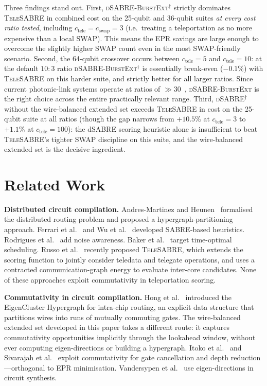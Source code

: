 \documentclass[conference]{IEEEtran}
\newcommand{\dSABRE}{\textsc{dSABRE}}
\newcommand{\BurstExt}{\textsc{dSABRE-BurstExt}}
\newcommand{\TeleSABRE}{\textsc{TeleSABRE}}
\newcommand{\SABRE}{\textsc{SABRE}}
\begin{document}
Three findings stand out.
First, \BurstExt$^{\dagger}$ strictly dominates \TeleSABRE{} in combined
cost on the 25-qubit and 36-qubit suites \emph{at every cost ratio tested},
including $c_{\mathrm{tele}}=c_{\mathrm{swap}}=3$ (i.e.\ treating a
teleportation as no more expensive than a local SWAP).
This means the EPR savings are large enough to overcome the slightly higher
SWAP count even in the most SWAP-friendly scenario.
Second, the 64-qubit crossover occurs between $c_{\mathrm{tele}}=5$ and
$c_{\mathrm{tele}}=10$: at the default $10{:}3$ ratio \BurstExt$^{\dagger}$
is essentially break-even ($-0.1\%$) with \TeleSABRE{} on this harder
suite, and strictly better for all larger ratios.
Since current photonic-link systems operate at ratios of ${\gg}30$~\cite{stephenson2020high},
\BurstExt{} is the right choice across the entire practically relevant range.
Third, \dSABRE$^{\dagger}$ without the wire-balanced extended set
exceeds \TeleSABRE{} in cost on the 25-qubit suite at all ratios
(though the gap narrows from $+10.5\%$ at $c_{\mathrm{tele}}=3$
to $+1.1\%$ at $c_{\mathrm{tele}}=100$): the dSABRE scoring heuristic
alone is insufficient to beat \TeleSABRE{}'s tighter SWAP discipline
on this suite, and the wire-balanced extended set is the decisive ingredient.

\section{Related Work}
\label{sec:related}

\textbf{Distributed circuit compilation.}
Andres-Martinez and Heunen~\cite{andres2019automated} formalised the distributed
routing problem and proposed a hypergraph-partitioning approach.
Ferrari et al.~\cite{ferrari2021compiler} and Wu et al.~\cite{wu2022collcomm}
developed \SABRE{}-based heuristics.
Rodrigues et al.~\cite{rodrigues2022noise} add noise awareness.
Baker et al.~\cite{baker2020time} target time-optimal scheduling.
Russo et al.~\cite{russo2025telesabre} recently proposed \TeleSABRE{}, which
extends the scoring function to jointly consider teledata and telegate operations,
and uses a contracted communication-graph energy to evaluate inter-core candidates.
None of these approaches exploit commutativity in teleportation scoring.

\textbf{Commutativity in circuit compilation.}
Hong et al.~\cite{hong2024commutativity} introduced the EigenCluster Hypergraph
for intra-chip routing, an explicit data structure that partitions wires into
runs of mutually commuting gates.
The wire-balanced extended set developed in this paper takes a different
route: it captures commutativity opportunities implicitly through the
lookahead window, without ever computing eigen-directions or building a
hypergraph.
Itoko et al.~\cite{itoko2020optimization} and Sivarajah et
al.~\cite{sivarajah2020tket} exploit commutativity for gate cancellation and
depth reduction---orthogonal to EPR minimisation.
Vandersypen et al.~\cite{iten2016introduction} use eigen-directions in circuit
synthesis.
\end{document}
